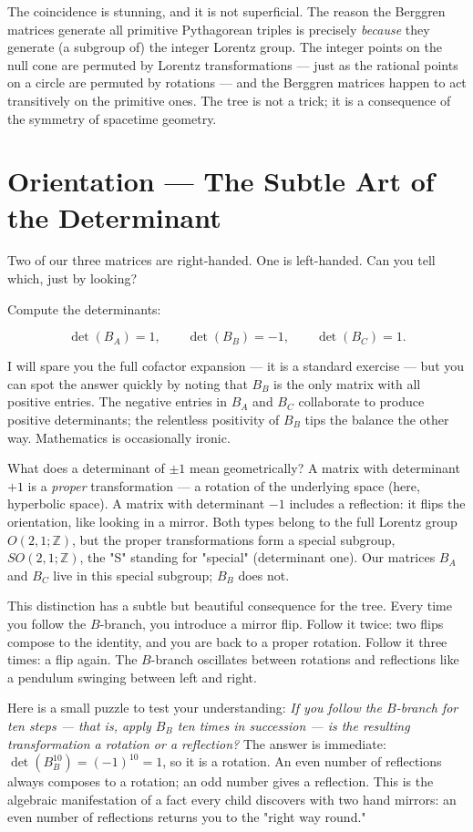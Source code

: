 \documentclass[11pt,twoside,openright]{book}
\theoremstyle{definition}
\theoremstyle{remark}
\begin{document}
The coincidence is stunning, and it is not superficial. The reason the Berggren matrices generate all primitive Pythagorean triples is precisely \textit{because} they generate (a subgroup of) the integer Lorentz group. The integer points on the null cone are permuted by Lorentz transformations --- just as the rational points on a circle are permuted by rotations --- and the Berggren matrices happen to act transitively on the primitive ones. The tree is not a trick; it is a consequence of the symmetry of spacetime geometry.


\section{Orientation --- The Subtle Art of the Determinant}

Two of our three matrices are right-handed. One is left-handed. Can you tell which, just by looking?

Compute the determinants:

\[\det(B_A) = 1, \qquad \det(B_B) = -1, \qquad \det(B_C) = 1.\]

I will spare you the full cofactor expansion --- it is a standard exercise --- but you can spot the answer quickly by noting that $B_B$ is the only matrix with all positive entries. The negative entries in $B_A$ and $B_C$ collaborate to produce positive determinants; the relentless positivity of $B_B$ tips the balance the other way. Mathematics is occasionally ironic.

What does a determinant of $\pm 1$ mean geometrically? A matrix with determinant $+1$ is a \textit{proper} transformation --- a rotation of the underlying space (here, hyperbolic space). A matrix with determinant $-1$ includes a reflection: it flips the orientation, like looking in a mirror. Both types belong to the full Lorentz group $O(2, 1; \mathbb{Z})$, but the proper transformations form a special subgroup, $SO(2, 1; \mathbb{Z})$, the "S" standing for "special" (determinant one). Our matrices $B_A$ and $B_C$ live in this special subgroup; $B_B$ does not.

This distinction has a subtle but beautiful consequence for the tree. Every time you follow the $B$-branch, you introduce a mirror flip. Follow it twice: two flips compose to the identity, and you are back to a proper rotation. Follow it three times: a flip again. The $B$-branch oscillates between rotations and reflections like a pendulum swinging between left and right.

Here is a small puzzle to test your understanding: \textit{If you follow the $B$-branch for ten steps --- that is, apply $B_B$ ten times in succession --- is the resulting transformation a rotation or a reflection?} The answer is immediate: $\det(B_B^{10}) = (-1)^{10} = 1$, so it is a rotation. An even number of reflections always composes to a rotation; an odd number gives a reflection. This is the algebraic manifestation of a fact every child discovers with two hand mirrors: an even number of reflections returns you to the "right way round."
\end{document}
